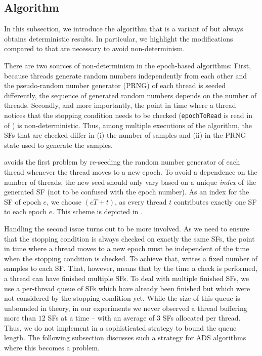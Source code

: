 \subsection{\Indexedframe Algorithm}
\label{sec:betw-apx:indexed-frame}
%
In this subsection, we introduce the \indexedframe
algorithm that is a variant of \localframe but always obtains
deterministic results. In particular, we highlight the
modifications compared to \localframe that are necessary
to avoid non-determinism.

There are two sources of non-determinism in the epoch-based
algorithms: First, because threads generate random numbers
independently from each other and the pseudo-random number
generator (PRNG) of each thread is seeded differently, the
sequence of generated random numbers depends on the number of
threads.
%
Secondly, and more importantly, the point in time where a thread notices that
the stopping condition needs to be checked (\ie \texttt{epochToRead} is read in
 of ) is
non-deterministic. Thus, among multiple executions of the algorithm, the SFs
that are checked differ in (i) the number of samples and (ii) in the PRNG state
used to generate the samples.

\Indexedframe avoids the first problem by re-seeding the random number
generator of each thread whenever the thread moves to a new epoch.
To avoid a dependence on the number of threads, the new seed should
only vary based on a unique \emph{index} of the generated SF (not to be
confused with the epoch number). As an index for the SF of epoch $e$,
we choose $(eT + t)$, as every thread $t$ contributes exactly one SF
to each epoch $e$. This scheme is depicted in
.

Handling the second issue turns out to be more involved.
As we need to ensure that the stopping condition is always checked
on exactly the same SFs, the point in time where a thread moves to
a new epoch must be independent of the time when the stopping
condition is checked.
%
To achieve that, \indexedframe writes a fixed number of samples
to each SF. That, however, means that by the time a check is
performed, a thread can have finished multiple SFs. To deal
with multiple finished SFs, we use a per-thread queue of
SFs which have already been finished but which were not
considered by the stopping condition yet. While the size
of this queue is unbounded in theory, in our experiments we
never observed a thread buffering more than $12$ SFs at a
time -- with an average of $3$ SFs allocated per thread.
Thus, we do not implement in \indexedframe a sophisticated strategy to bound
the queue length. The following subsection discusses such a strategy
for ADS algorithms where this becomes a problem.

